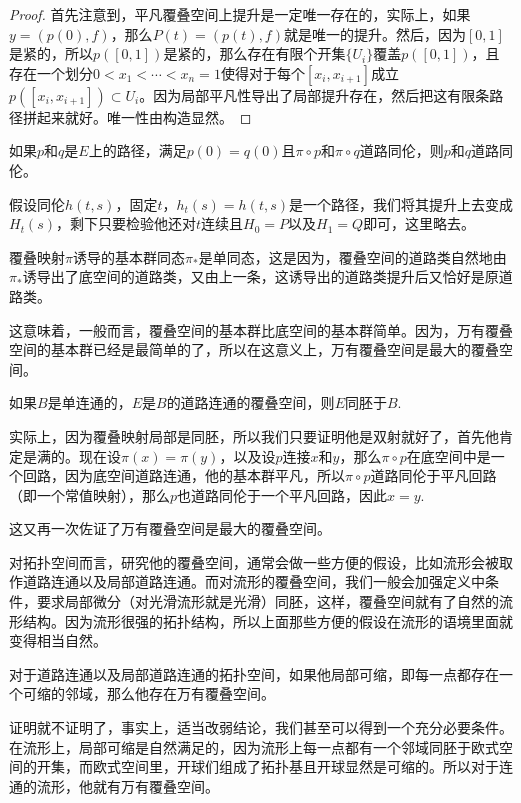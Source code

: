 \begin{proof}
首先注意到，平凡覆叠空间上提升是一定唯一存在的，实际上，如果$y=(p(0),f)$，那么$P(t)=(p(t),f)$就是唯一的提升。然后，因为$[0,1]$是紧的，所以$p([0,1])$是紧的，那么存在有限个开集$\{U_i\}$覆盖$p([0,1])$，且存在一个划分$0<x_1<\cdots<x_n=1$使得对于每个$[x_i,x_{i+1}]$成立$p([x_i,x_{i+1}])\subset U_i$。因为局部平凡性导出了局部提升存在，然后把这有限条路径拼起来就好。唯一性由构造显然。
\end{proof}

\begin{pro}
如果$p$和$q$是$E$上的路径，满足$p(0)=q(0)$且$\pi\circ p$和$\pi\circ q$道路同伦，则$p$和$q$道路同伦。
\end{pro}

假设同伦$h(t,s)$，固定$t$，$h_t(s)=h(t,s)$是一个路径，我们将其提升上去变成$H_t(s)$，剩下只要检验他还对$t$连续且$H_0=P$以及$H_1=Q$即可，这里略去。

\para 覆叠映射$\pi$诱导的基本群同态$\pi_*$是单同态，这是因为，覆叠空间的道路类自然地由$\pi_*$诱导出了底空间的道路类，又由上一条，这诱导出的道路类提升后又恰好是原道路类。\endpara

这意味着，一般而言，覆叠空间的基本群比底空间的基本群简单。因为，万有覆叠空间的基本群已经是最简单的了，所以在这意义上，万有覆叠空间是最大的覆叠空间。

\para 如果$B$是单连通的，$E$是$B$的道路连通的覆叠空间，则$E$同胚于$B$. \endpara

实际上，因为覆叠映射局部是同胚，所以我们只要证明他是双射就好了，首先他肯定是满的。现在设$\pi(x)=\pi(y)$，以及设$p$连接$x$和$y$，那么$\pi\circ p$在底空间中是一个回路，因为底空间道路连通，他的基本群平凡，所以$\pi\circ p$道路同伦于平凡回路（即一个常值映射），那么$p$也道路同伦于一个平凡回路，因此$x=y$.

这又再一次佐证了万有覆叠空间是最大的覆叠空间。

\para 对拓扑空间而言，研究他的覆叠空间，通常会做一些方便的假设，比如流形会被取作道路连通以及局部道路连通。而对流形的覆叠空间，我们一般会加强定义中条件，要求局部微分（对光滑流形就是光滑）同胚，这样，覆叠空间就有了自然的流形结构。因为流形很强的拓扑结构，所以上面那些方便的假设在流形的语境里面就变得相当自然。

\begin{thm}
对于道路连通以及局部道路连通的拓扑空间，如果他局部可缩，即每一点都存在一个可缩的邻域，那么他存在万有覆叠空间。
\end{thm}

证明就不证明了，事实上，适当改弱结论，我们甚至可以得到一个充分必要条件。在流形上，局部可缩是自然满足的，因为流形上每一点都有一个邻域同胚于欧式空间的开集，而欧式空间里，开球们组成了拓扑基且开球显然是可缩的。所以对于连通的流形，他就有万有覆叠空间。

